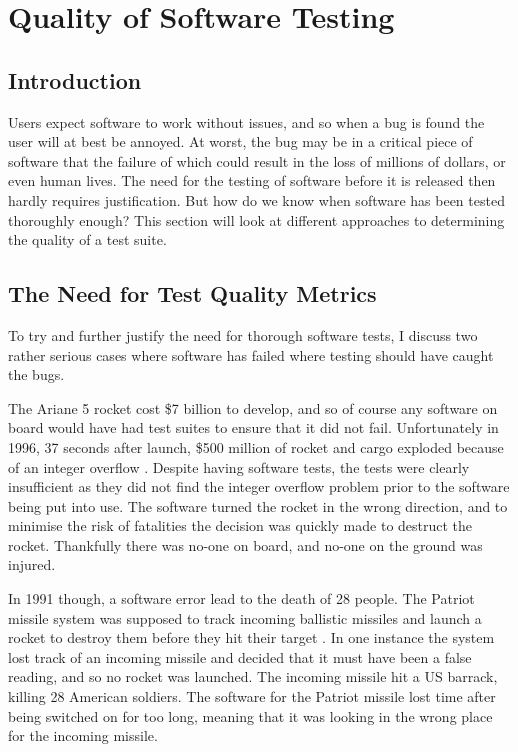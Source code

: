 \section{Quality of Software Testing}
\subsection{Introduction}

Users expect software to work without issues, and so when a bug is found the user will at best be annoyed. At worst, the bug may be in a critical piece of software that the failure of which could result in the loss of millions of dollars, or even human lives. The need for the testing of software before it is released then hardly requires justification. But how do we know when software has been tested thoroughly enough? This section will look at different approaches to determining the quality of a test suite. 

\subsection{The Need for Test Quality Metrics}

To try and further justify the need for thorough software tests, I discuss two rather serious cases where software has failed where testing should have caught the bugs.

The Ariane 5 rocket cost \$7 billion to develop, and so of course any software on board would have had test suites to ensure that it did not fail. Unfortunately in 1996, 37 seconds after launch, \$500 million of rocket and cargo exploded because of an integer overflow \citep{ariane5}. Despite having software tests, the tests were clearly insufficient as they did not find the integer overflow problem prior to the software being put into use. The software turned the rocket in the wrong direction, and to minimise the risk of fatalities the decision was quickly made to destruct the rocket. Thankfully there was no-one on board, and no-one on the ground was injured.

In 1991 though, a software error lead to the death of 28 people. The Patriot missile system was supposed to track incoming ballistic missiles and launch a rocket to destroy them before they hit their target \citep{patriotMissile}. In one instance the system lost track of an incoming missile and decided that it must have been a false reading, and so no rocket was launched. The incoming missile hit a US barrack, killing 28 American soldiers. The software for the Patriot missile lost time after being switched on for too long, meaning that it was looking in the wrong place for the incoming missile.

